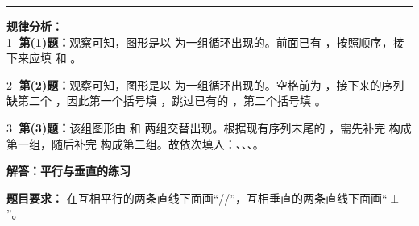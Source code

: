 \vspace{1.2cm}
\hrule
\vspace{0.4cm}

{\small\color{gray}
\textbf{规律分析：}\\
\textcircled{1} \textbf{第(1)题：}观察可知，图形是以 \tikzTriangle{} \tikzCircle{} \tikzSquare{} 为一组循环出现的。前面已有 \tikzTriangle{} \tikzCircle{}，按照顺序，接下来应填 \tikzSquare{} 和 \tikzTriangle{}。

\vspace{0.3cm}
\textcircled{2} \textbf{第(2)题：}观察可知，图形是以 \tikzSquare{} \tikzSquare{} \tikzCircle{} \tikzTriangle{} 为一组循环出现的。空格前为 \tikzSquare{}，接下来的序列缺第二个 \tikzSquare{}，因此第一个括号填 \tikzSquare{}，跳过已有的 \tikzCircle{}，第二个括号填 \tikzTriangle{}。

\vspace{0.3cm}
\textcircled{3} \textbf{第(3)题：}该组图形由 \tikzSolidTriangle{} \tikzStar{} \tikzStar{} 和 \tikzSolidTriangle{} \tikzSolidTriangle{} \tikzSolidTriangle{} 两组交替出现。根据现有序列末尾的 \tikzSolidTriangle{} \tikzStar{}，需先补完 \tikzStar{} 构成第一组，随后补完 \tikzSolidTriangle{} \tikzSolidTriangle{} \tikzSolidTriangle{} 构成第二组。故依次填入：\tikzStar{}、\tikzSolidTriangle{}、\tikzSolidTriangle{}、\tikzSolidTriangle{}。
}




\newpage

\begin{center}
  {\large\bfseries 解答：平行与垂直的练习}
\end{center}

\vspace{0.6cm}

\noindent
{\small \textbf{题目要求：} 在互相平行的两条直线下面画“//”，互相垂直的两条直线下面画“$\perp$”。}

\vspace{0.8cm}


